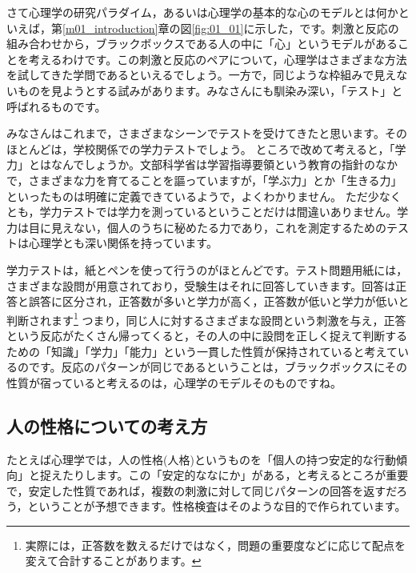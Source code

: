 \documentclass{ltjbook}
\begin{document}
さて心理学の研究パラダイム，あるいは心理学の基本的な心のモデルとは何かといえば，第\ref{m01_introduction}章の図\ref{fig:01_01}に示した，です。刺激と反応の組み合わせから，ブラックボックスである人の中に「心」というモデルがあることを考えるわけです。この刺激と反応のペアについて，心理学はさまざまな方法を試してきた学問であるといえるでしょう。一方で，同じような枠組みで見えないものを見ようとする試みがあります。みなさんにも馴染み深い，「テスト」と呼ばれるものです。

みなさんはこれまで，さまざまなシーンでテストを受けてきたと思います。そのほとんどは，学校関係での学力テストでしょう。
ところで改めて考えると，「学力」とはなんでしょうか。文部科学省は学習指導要領という教育の指針のなかで，さまざまな力を育てることを謳っていますが，「学ぶ力」とか「生きる力」といったものは明確に定義できているようで，よくわかりません。
ただ少なくとも，学力テストでは学力を測っているということだけは間違いありません。学力は目に見えない，個人のうちに秘めたる力であり，これを測定するためのテストは心理学とも深い関係を持っています。

学力テストは，紙とペンを使って行うのがほとんどです。テスト問題用紙には，さまざまな設問が用意されており，受験生はそれに回答していきます。回答は正答と誤答に区分され，正答数が多いと学力が高く，正答数が低いと学力が低いと判断されます\footnote{実際には，正答数を数えるだけではなく，問題の重要度などに応じて配点を変えて合計することがあります。}
つまり，同じ人に対するさまざまな設問という刺激を与え，正答という反応がたくさん帰ってくると，その人の中に設問を正しく捉えて判断するための「知識」「学力」「能力」という一貫した性質が保持されていると考えているのです。反応のパターンが同じであるということは，ブラックボックスにその性質が宿っていると考えるのは，心理学のモデルそのものですね。

\subsection{人の性格についての考え方}
たとえば心理学では，人の性格(人格)というものを「個人の持つ安定的な行動傾向」と捉えたりします。この「安定的ななにか」がある，と考えるところが重要で，安定した性質であれば，複数の刺激に対して同じパターンの回答を返すだろう，ということが予想できます。性格検査はそのような目的で作られています。
\end{document}
